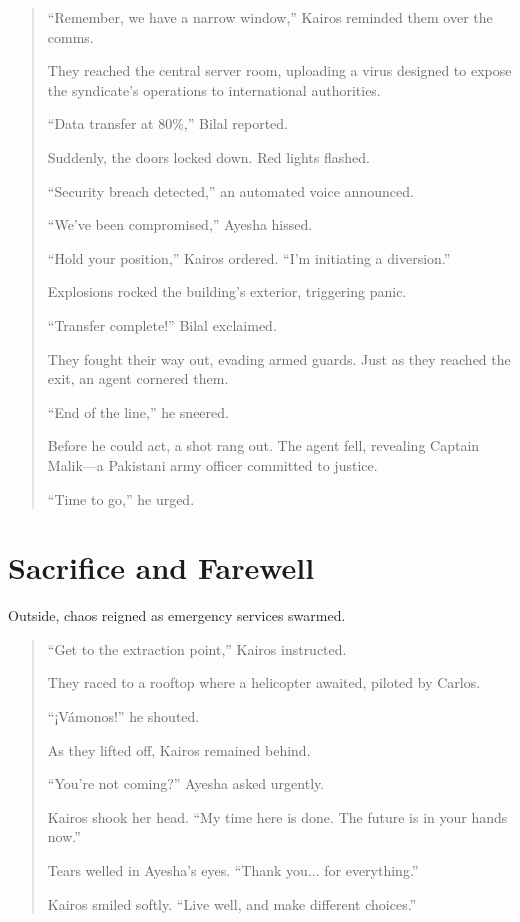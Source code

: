 \documentclass[12pt]{book}
\begin{document}
\begin{quote}
    ``Remember, we have a narrow window,'' Kairos reminded them over the comms.

    They reached the central server room, uploading a virus designed to expose the syndicate's operations to international authorities.

    ``Data transfer at 80\%,'' Bilal reported.

    Suddenly, the doors locked down. Red lights flashed.

    ``Security breach detected,'' an automated voice announced.

    ``We've been compromised,'' Ayesha hissed.

    ``Hold your position,'' Kairos ordered. ``I'm initiating a diversion.''

    Explosions rocked the building's exterior, triggering panic.

    ``Transfer complete!'' Bilal exclaimed.

    They fought their way out, evading armed guards. Just as they reached the exit, an agent cornered them.

    ``End of the line,'' he sneered.

    Before he could act, a shot rang out. The agent fell, revealing Captain Malik—a Pakistani army officer committed to justice.

    ``Time to go,'' he urged.
\end{quote}

\chapter{Sacrifice and Farewell}

Outside, chaos reigned as emergency services swarmed.

\begin{quote}
    ``Get to the extraction point,'' Kairos instructed.

    They raced to a rooftop where a helicopter awaited, piloted by Carlos.

    ``¡Vámonos!'' he shouted.

    As they lifted off, Kairos remained behind.

    ``You're not coming?'' Ayesha asked urgently.

    Kairos shook her head. ``My time here is done. The future is in your hands now.''

    Tears welled in Ayesha's eyes. ``Thank you... for everything.''

    Kairos smiled softly. ``Live well, and make different choices.''
\end{quote}
\end{document}
